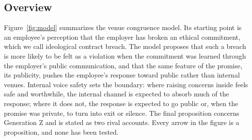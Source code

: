 \subsection{Overview}

Figure~\ref{fig:model} summarizes the venue congruence model. Its starting point is an employee's perception that the employer has broken an ethical commitment, which we call ideological contract breach. The model proposes that such a breach is more likely to be felt as a violation when the commitment was learned through the employer's public communication, and that the same feature of the promise, its publicity, pushes the employee's response toward public rather than internal venues. Internal voice safety sets the boundary: where raising concerns inside feels safe and worthwhile, the internal channel is expected to absorb much of the response; where it does not, the response is expected to go public or, when the promise was private, to turn into exit or silence. The final proposition concerns Generation Z and is stated as two rival accounts. Every arrow in the figure is a proposition, and none has been tested.

